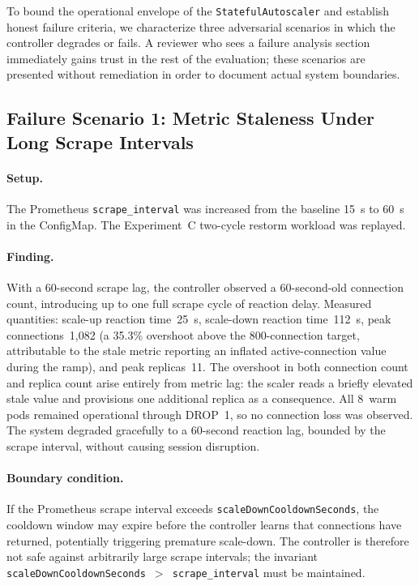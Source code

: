 \documentclass[twocolumn]{svjour3}
\begin{document}
To bound the operational envelope of the \texttt{StatefulAutoscaler} and establish honest failure criteria, we characterize three adversarial scenarios in which the controller degrades or fails. A reviewer who sees a failure analysis section immediately gains trust in the rest of the evaluation; these scenarios are presented without remediation in order to document actual system boundaries.

\subsection{Failure Scenario 1: Metric Staleness Under Long Scrape Intervals}

\paragraph{Setup.} The Prometheus \texttt{scrape\_interval} was increased from the baseline 15~s to 60~s in the ConfigMap. The Experiment~C two-cycle restorm workload was replayed.

\paragraph{Finding.} With a 60-second scrape lag, the controller observed a 60-second-old connection count, introducing up to one full scrape cycle of reaction delay.  Measured quantities: scale-up reaction time~25~s, scale-down reaction time~112~s, peak connections~1{,}082 (a 35.3\% overshoot above the 800-connection target, attributable to the stale metric reporting an inflated active-connection value during the ramp), and peak replicas~11.  The overshoot in both connection count and replica count arise entirely from metric lag: the scaler reads a briefly elevated stale value and provisions one additional replica as a consequence.  All 8~warm pods remained operational through DROP~1, so no connection loss was observed.  The system degraded gracefully to a 60-second reaction lag, bounded by the scrape interval, without causing session disruption.

\paragraph{Boundary condition.} If the Prometheus scrape interval exceeds \texttt{scaleDownCooldownSeconds}, the cooldown window may expire before the controller learns that connections have returned, potentially triggering premature scale-down. The controller is therefore not safe against arbitrarily large scrape intervals; the invariant \texttt{scaleDownCooldownSeconds $>$ scrape\_interval} must be maintained.
\end{document}
